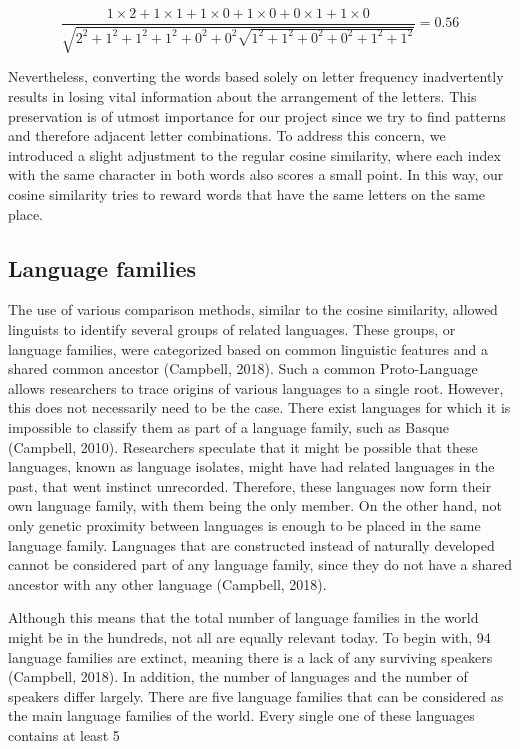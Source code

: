 {\footnotesize
	\[
	\frac{1 \times 2 + 1 \times 1 + 1 \times 0 + 1 \times 0 + 0 \times 1 + 1 \times 0}{\sqrt{2^2 + 1^2 + 1^2 + 1^2 + 0^2 + 0^2 \sqrt{1^2 + 1^2 + 0^2 + 0^2 + 1^2 + 1^2}}} = 0.56
\]
}

Nevertheless, converting the words based solely on letter frequency inadvertently results in losing vital information about the arrangement of the letters. This preservation is of utmost importance for our project since we try to find patterns and therefore adjacent letter combinations. To address this concern, we introduced a slight adjustment to the regular cosine similarity, where each index with the same character in both words also scores a small point. In this way, our cosine similarity tries to reward words that have the same letters on the same place.

\subsection{Language families}

The use of various comparison methods, similar to the cosine similarity, allowed linguists to identify several groups of related languages. These groups, or language families, were categorized based on common linguistic features and a shared common ancestor (Campbell, 2018). Such a common Proto-Language allows researchers to trace origins of various languages to a single root. However, this does not necessarily need to be the case. There exist languages for which it is impossible to classify them as part of a language family, such as Basque (Campbell, 2010). Researchers speculate that it might be possible that these languages, known as language isolates, might have had related languages in the past, that went instinct unrecorded. Therefore, these languages now form their own language family, with them being the only member. On the other hand, not only genetic proximity between languages is enough to be placed in the same language family. Languages that are constructed instead of naturally developed cannot be considered part of any language family, since they do not have a shared ancestor with any other language (Campbell, 2018). 

Although this means that the total number of language families in the world might be in the hundreds, not all are equally relevant today. To begin with, 94 language families are extinct, meaning there is a lack of any surviving speakers (Campbell, 2018). In addition, the number of languages and the number of speakers differ largely. There are five language families that can be considered as the main language families of the world. Every single one of these languages contains at least 5%

